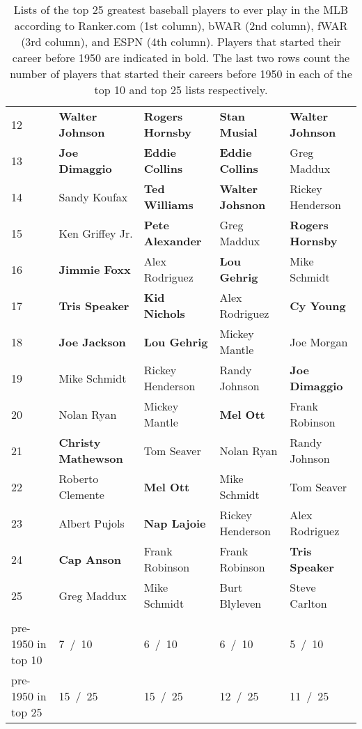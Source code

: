 \documentclass[11pt]{article}\usepackage[]{graphicx}\usepackage[]{color}
\begin{document}
\begin{table}[h!]
\begin{center}
\begin{tabular}{lllll}
12 & {\bf Walter Johnson}    & {\bf Rogers Hornsby} & {\bf Stan Musial}    & {\bf Walter Johnson} \\
13 & {\bf Joe Dimaggio}      & {\bf Eddie Collins}  & {\bf Eddie Collins}  & Greg Maddux          \\
14 & Sandy Koufax            & {\bf Ted Williams}   & {\bf Walter Johsnon} & Rickey Henderson     \\ 
15 & Ken Griffey Jr.         & {\bf Pete Alexander} & Greg Maddux          & {\bf Rogers Hornsby} \\
16 & {\bf Jimmie Foxx}       & Alex Rodriguez       & {\bf Lou Gehrig}     & Mike Schmidt         \\
17 & {\bf Tris Speaker}      & {\bf Kid Nichols}    & Alex Rodriguez       & {\bf Cy Young}       \\
18 & {\bf Joe Jackson}       & {\bf Lou Gehrig}     & Mickey Mantle        & Joe Morgan           \\
19 & Mike Schmidt            & Rickey Henderson     & Randy Johnson        & {\bf Joe Dimaggio}   \\
20 & Nolan Ryan              & Mickey Mantle        & {\bf Mel Ott}        & Frank Robinson       \\
21 & {\bf Christy Mathewson} & Tom Seaver           & Nolan Ryan           & Randy Johnson        \\
22 & Roberto Clemente        & {\bf Mel Ott}        & Mike Schmidt         & Tom Seaver           \\
23 & Albert Pujols           & {\bf Nap Lajoie}     & Rickey Henderson     & Alex Rodriguez       \\
24 & {\bf Cap Anson}         & Frank Robinson       & Frank Robinson       & {\bf Tris Speaker}   \\
25 & Greg Maddux             & Mike Schmidt         & Burt Blyleven        & Steve Carlton        \\
 & & & & \\
pre-1950 in top 10 &   7 \,/\, 10  &   6 \,/\, 10  &   6 \,/\, 10  &   5 \,/\, 10  \\
pre-1950 in top 25 &  15 \,/\, 25  &  15 \,/\, 25  &  12 \,/\, 25  &  11 \,/\, 25  \\
\hline
\end{tabular}
\end{center}
\caption{Lists of the top 25 greatest baseball players to ever play in the 
  MLB according to Ranker.com (1st column), bWAR (2nd column), 
  fWAR (3rd column), and ESPN (4th column). Players that started their career 
  before 1950 are indicated in bold. The last two rows count the number of players 
  that started their careers before 1950 in each of the top 10 and top 25 lists 
  respectively.}
\label{top25}
\end{table}
\end{document}

